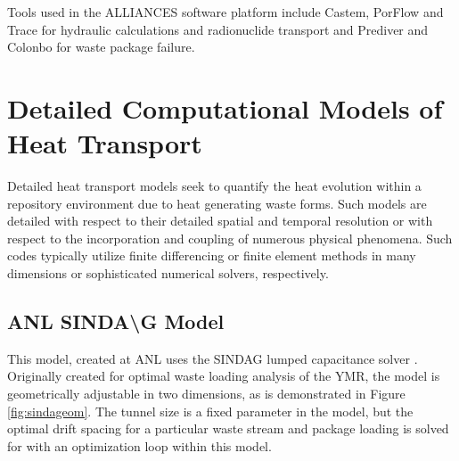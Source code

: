 {Tools used in the ALLIANCES software platform include Castem, PorFlow and Trace
for hydraulic calculations and radionuclide transport and Prediver and Colonbo for
waste package failure.






\section{Detailed Computational Models of Heat Transport}
\label{sec:detailed_heat}


Detailed heat transport models seek to quantify the heat evolution within a 
repository environment due to heat generating waste forms. Such models are 
detailed with respect to their detailed spatial and temporal resolution or 
with respect to the incorporation and coupling of numerous physical phenomena. 
Such codes typically utilize finite differencing or finite element methods in 
many dimensions or sophisticated numerical solvers, respectively. 



\subsection{ANL SINDA{\textbackslash}G Model}

This model, created at \gls{ANL} uses the \gls{SINDAG} 
lumped capacitance solver \cite{gaski_sinda_1987}. Originally created for optimal waste loading analysis 
of the \gls{YMR}, the model is geometrically adjustable in two dimensions,   
as is demonstrated in Figure \ref{fig:sindageom}. The tunnel size is a fixed 
parameter in the model, but the optimal drift spacing for a particular waste 
stream and package loading is solved for with an optimization loop within this 
model.

}
